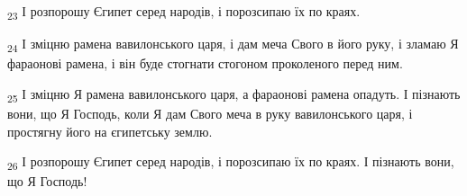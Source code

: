 \begin{tcolorbox}
\textsubscript{23} І розпорошу Єгипет серед народів, і порозсипаю їх по краях.
\end{tcolorbox}
\begin{tcolorbox}
\textsubscript{24} І зміцню рамена вавилонського царя, і дам меча Свого в його руку, і зламаю Я фараонові рамена, і він буде стогнати стогоном проколеного перед ним.
\end{tcolorbox}
\begin{tcolorbox}
\textsubscript{25} І зміцню Я рамена вавилонського царя, а фараонові рамена опадуть. І пізнають вони, що Я Господь, коли Я дам Свого меча в руку вавилонського царя, і простягну його на єгипетську землю.
\end{tcolorbox}
\begin{tcolorbox}
\textsubscript{26} І розпорошу Єгипет серед народів, і порозсипаю їх по краях. І пізнають вони, що Я Господь!
\end{tcolorbox}
